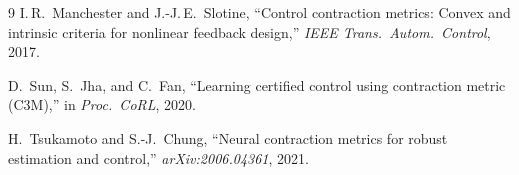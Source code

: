 \documentclass[11pt,a4paper]{article}
\begin{document}
\begin{thebibliography}{9}
I.\,R.~Manchester and J.-J.\,E.~Slotine,
``Control contraction metrics: Convex and intrinsic criteria for nonlinear feedback design,''
\textit{IEEE Trans.\ Autom.\ Control}, 2017.

D.~Sun, S.~Jha, and C.~Fan,
``Learning certified control using contraction metric (C3M),''
in \textit{Proc.\ CoRL}, 2020.

H.~Tsukamoto and S.-J.~Chung,
``Neural contraction metrics for robust estimation and control,''
\textit{arXiv:2006.04361}, 2021.
\end{thebibliography}
\end{document}
